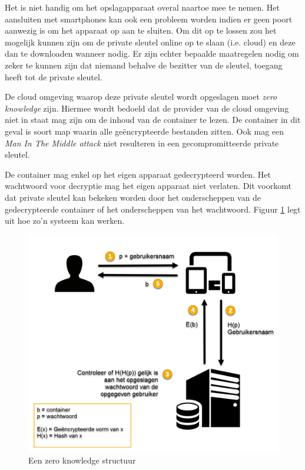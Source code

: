 Het is niet handig om het opslagapparaat overal naartoe mee te nemen. Het
aansluiten met smartphones kan ook een probleem worden indien er geen poort
aanwezig is om het apparaat op aan te sluiten. Om dit op te lossen zou het
mogelijk kunnen zijn om de private sleutel online op te slaan (i.e. cloud) en
deze dan te downloaden wanneer nodig. Er zijn echter bepaalde maatregelen nodig
om zeker te kunnen zijn dat niemand behalve de bezitter van de sleutel, toegang
heeft tot de private sleutel.

De cloud omgeving waarop deze private sleutel wordt opgeslagen moet \textit{zero
knowledge} zijn. Hiermee wordt bedoeld dat de provider van de cloud omgeving
niet in staat mag zijn om de inhoud van de container te lezen. De container in
dit geval is soort map waarin alle geëncrypteerde bestanden zitten. Ook mag een
\textit{Man In The Middle attack} niet resulteren in een gecompromitteerde
private sleutel.

De container mag enkel op het eigen apparaat gedecrypteerd worden. Het
wachtwoord voor decryptie mag het eigen apparaat niet verlaten. Dit voorkomt dat
private sleutel kan bekeken worden door het onderscheppen van de gedecrypteerde
container of het onderscheppen van het wachtwoord. Figuur
\ref{fig:online-zero-knowledge-container} legt uit hoe zo’n systeem kan werken.

\begin{figure}[H]
	\includegraphics[width=\textwidth,keepaspectratio]{img/encrypted-container-sharing.png}
	\centering
	\caption{Een zero knowledge structuur}
	\label{fig:online-zero-knowledge-container}
\end{figure}

